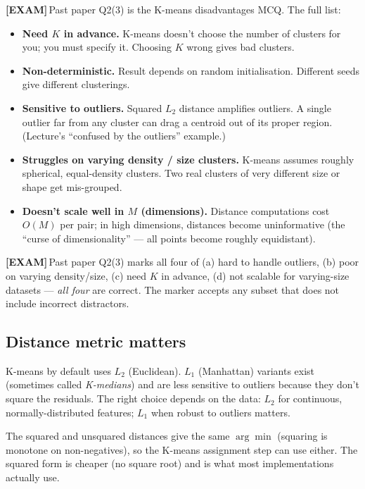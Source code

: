 \documentclass[11pt, a4paper]{article}
\newcommand{\examflag}{\textcolor{tipBd}{\textbf{[EXAM]}}\,}
\begin{document}
\examflag{}Past paper Q2(3) is the K-means disadvantages MCQ. The full list:

\begin{itemize}
  \item \textbf{Need $K$ in advance.} K-means doesn't choose the number of clusters for you; you must specify it. Choosing $K$ wrong gives bad clusters.
  \item \textbf{Non-deterministic.} Result depends on random initialisation. Different seeds give different clusterings.
  \item \textbf{Sensitive to outliers.} Squared $L_2$ distance amplifies outliers. A single outlier far from any cluster can drag a centroid out of its proper region. (Lecture's ``confused by the outliers'' example.)
  \item \textbf{Struggles on varying density / size clusters.} K-means assumes roughly spherical, equal-density clusters. Two real clusters of very different size or shape get mis-grouped.
  \item \textbf{Doesn't scale well in $M$ (dimensions).} Distance computations cost $O(M)$ per pair; in high dimensions, distances become uninformative (the ``curse of dimensionality'' — all points become roughly equidistant).
\end{itemize}

\examflag{}Past paper Q2(3) marks all four of (a) hard to handle outliers, (b) poor on varying density/size, (c) need $K$ in advance, (d) not scalable for varying-size datasets — \emph{all four} are correct. The marker accepts any subset that does not include incorrect distractors.

\subsection{Distance metric matters}

K-means by default uses $L_2$ (Euclidean). $L_1$ (Manhattan) variants exist (sometimes called \emph{K-medians}) and are less sensitive to outliers because they don't square the residuals. The right choice depends on the data: $L_2$ for continuous, normally-distributed features; $L_1$ when robust to outliers matters.

\begin{pitfallbox}
The squared and unsquared distances give the same $\arg\min$ (squaring is monotone on non-negatives), so the K-means assignment step can use either. The squared form is cheaper (no square root) and is what most implementations actually use.
\end{pitfallbox}
\end{document}

